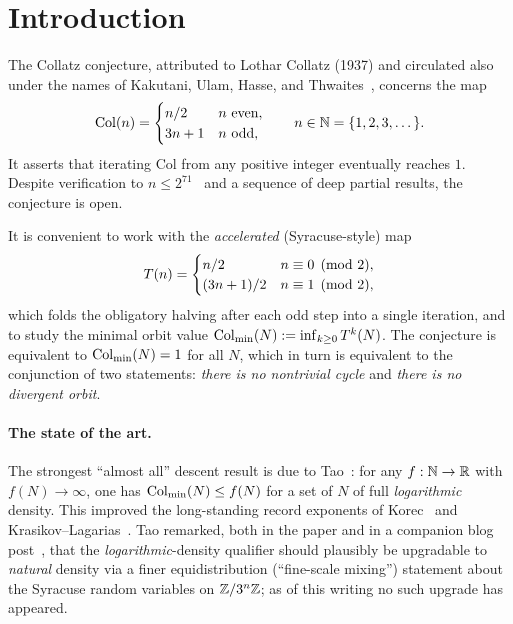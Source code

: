 \documentclass[11pt]{amsart}
\theoremstyle{definition}
\theoremstyle{remark}
\begin{document}
\maketitle

\section{Introduction}
\label{sec:intro}

The Collatz conjecture, attributed to Lothar Collatz (1937) and circulated also under the names
of Kakutani, Ulam, Hasse, and Thwaites~\citep{lagarias1985}, concerns the map
\[
   \mathrm{Col}(n) = \begin{cases} n/2 & n \text{ even}, \\ 3n+1 & n \text{ odd}, \end{cases}
   \qquad n \in \mathbb{N} = \{1,2,3,\dots\}.
\]
It asserts that iterating $\mathrm{Col}$ from any positive integer eventually reaches $1$.
Despite verification to $n \le 2^{71}$~\citep{barina2021,barina2025} %
and a sequence of deep partial results, the conjecture is open.

It is convenient to work with the \emph{accelerated} (Syracuse-style) map
\begin{equation}
   T(n) = \begin{cases} n/2 & n \equiv 0 \pmod 2, \\ (3n+1)/2 & n \equiv 1 \pmod 2, \end{cases}
   \label{eq:Tmap}
\end{equation}
which folds the obligatory halving after each odd step into a single iteration, and to study the
minimal orbit value $\mathrm{Col}_{\min}(N) := \inf_{k \ge 0}T^k(N)$. The conjecture is equivalent to
$\mathrm{Col}_{\min}(N) = 1$ for all $N$, which in turn is equivalent to the conjunction of two statements:
\emph{there is no nontrivial cycle} and \emph{there is no divergent orbit}.

\paragraph{The state of the art.}
The strongest ``almost all'' descent result is due to Tao~\citep{tao2022}: for any
$f:\mathbb{N}\to\mathbb{R}$ with $f(N)\to\infty$, one has $\mathrm{Col}_{\min}(N)\le f(N)$ for a set of $N$ of full
\emph{logarithmic} density. This improved the long-standing record exponents of
Korec~\citep{korec1994} and Krasikov--Lagarias~\citep{krasikov2003}. Tao remarked, both in the
paper and in a companion blog post~\citep{tao2020blog}, that the \emph{logarithmic}-density
qualifier should plausibly be upgradable to \emph{natural} density via a finer equidistribution
(``fine-scale mixing'') statement about the Syracuse random variables on $\mathbb{Z}/3^{n}\mathbb{Z}$; as of this
writing no such upgrade has appeared.
\end{document}

